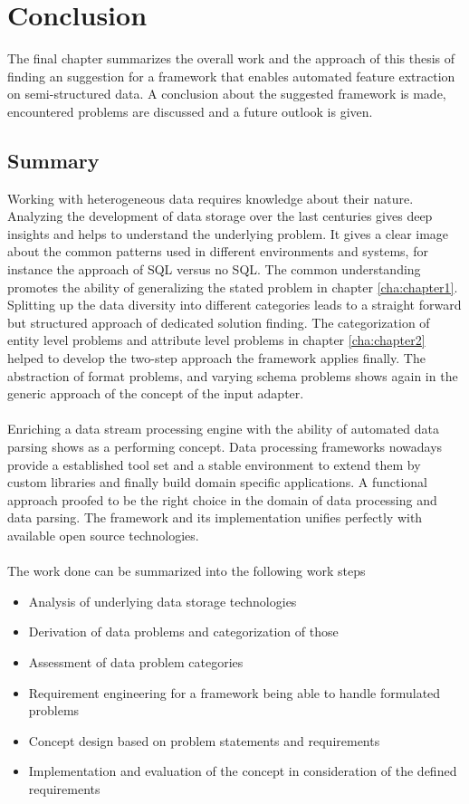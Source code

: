 \chapter{Conclusion\label{cha:chapter7}}

The final chapter summarizes the overall work and the approach of this thesis of finding an suggestion for a framework that enables automated feature extraction on semi-structured data. A conclusion about the suggested framework is made, encountered problems are discussed and a future outlook is given.  

\section{Summary\label{sec:summary}}

Working with heterogeneous data requires knowledge about their nature. Analyzing the development of data storage over the last centuries gives deep insights and helps to understand the underlying problem. It gives a clear image about the common patterns used in different environments and systems, for instance the approach of SQL versus no SQL. The common understanding promotes the ability of generalizing the stated problem in chapter \ref{cha:chapter1}. Splitting up the data diversity into different categories leads to a straight forward but structured approach of dedicated solution finding. The categorization of entity level problems and attribute level problems in chapter \ref{cha:chapter2} helped to develop the two-step approach the framework applies finally. The abstraction of format problems, and varying schema problems shows again in the generic approach of the concept of the input adapter.
\\\\
Enriching a data stream processing engine with the ability of automated data parsing shows as a performing concept. Data processing frameworks nowadays provide a established tool set and a stable environment to extend them by custom libraries and finally build domain specific applications. A functional approach proofed to be the right choice in the domain of data processing and data parsing. The framework and its implementation unifies perfectly with available open source technologies. 
\\\\
\noindent The work done can be summarized into the following work steps

\begin{itemize}
\item Analysis of underlying data storage technologies
\item Derivation of data problems and categorization of those
\item Assessment of data problem categories
\item Requirement engineering for a framework being able to handle formulated problems
\item Concept design based on problem statements and requirements
\item Implementation and evaluation of the concept in consideration of the defined requirements
\end{itemize}

